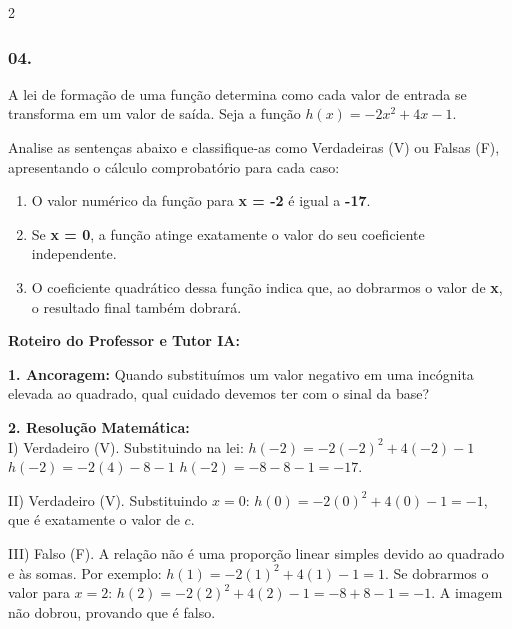 \begin{multicols*}{2}
\subsubsection*{04.} 
\begin{enunciadoLiteral}
A lei de formação de uma função determina como cada valor de entrada se transforma em um valor de saída. Seja a função $h(x) = -2x^2 + 4x - 1$.

Analise as sentenças abaixo e classifique-as como Verdadeiras (V) ou Falsas (F), apresentando o cálculo comprobatório para cada caso:

\begin{enumerate}[label=\Roman*.]
    \item O valor numérico da função para \textbf{x = -2} é igual a \textbf{-17}.
    \item Se \textbf{x = 0}, a função atinge exatamente o valor do seu coeficiente independente.
    \item O coeficiente quadrático dessa função indica que, ao dobrarmos o valor de \textbf{x}, o resultado final também dobrará.
\end{enumerate}
\end{enunciadoLiteral}

\ifgabarito
    \begin{tcolorbox}[colback=CorTitUm!5, colframe=CorTitUm, boxrule=1pt, arc=4pt, left=6pt, right=6pt, top=6pt, bottom=6pt]
    \small\textbf{\textcolor{CorTitUm}{Roteiro do Professor e Tutor IA:}}\par\vspace{0.1cm}
    \color{CinzaEscuro}
    \textbf{1. Ancoragem:} Quando substituímos um valor negativo em uma incógnita elevada ao quadrado, qual cuidado devemos ter com o sinal da base?\par\vspace{0.1cm}
    \textbf{2. Resolução Matemática:}\\
    I) Verdadeiro (V). Substituindo na lei:
    $h(-2) = -2(-2)^2 + 4(-2) - 1$
    $h(-2) = -2(4) - 8 - 1$
    $h(-2) = -8 - 8 - 1 = -17$.
    
    II) Verdadeiro (V). Substituindo $x=0$:
    $h(0) = -2(0)^2 + 4(0) - 1 = -1$, que é exatamente o valor de $c$.
    
    III) Falso (F). A relação não é uma proporção linear simples devido ao quadrado e às somas. Por exemplo:
    $h(1) = -2(1)^2 + 4(1) - 1 = 1$.
    Se dobrarmos o valor para $x=2$:
    $h(2) = -2(2)^2 + 4(2) - 1 = -8 + 8 - 1 = -1$.
    A imagem não dobrou, provando que é falso.
    \end{tcolorbox}
    \vspace{0.15cm}
    

\end{multicols*}
